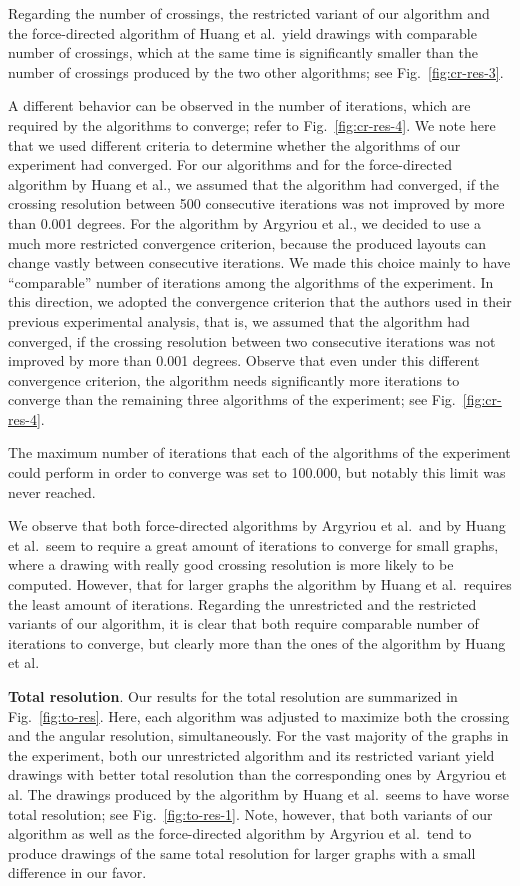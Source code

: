 \documentclass{comjnl}
\newcommand{\myparagraph}[1]{\medskip\noindent\textbf{#1}.}
\begin{document}
Regarding the number of crossings, the restricted variant of our algorithm and the force-directed algorithm of Huang et al.\ yield drawings with comparable number of crossings, which at the same time is significantly smaller than the  number of crossings produced by the two other algorithms; see Fig.~\ref{fig:cr-res-3}.

A different behavior can be observed in the number of iterations, which are required by the algorithms to converge; refer to Fig.~\ref{fig:cr-res-4}. We note here that we used different criteria to determine whether the algorithms of our experiment had converged. For our algorithms and for the force-directed algorithm by Huang et al., we assumed that the algorithm had converged, if the crossing resolution between 500 consecutive iterations was not improved by more than 0.001 degrees. For the algorithm by Argyriou et al., we decided to use a much more restricted convergence criterion, because the produced layouts can change vastly between  consecutive iterations. We made this choice mainly to have ``comparable'' number of iterations among the algorithms of the experiment. In this direction, we adopted the convergence criterion that the authors used in their previous experimental analysis, that is, we assumed that the algorithm had converged, if the crossing resolution between two consecutive iterations was not improved by more than 0.001 degrees. Observe that even under this different convergence criterion, the algorithm needs significantly more iterations to converge than the remaining three algorithms of the experiment; see Fig.~\ref{fig:cr-res-4}. 

The maximum number of iterations that each of the algorithms of the experiment could perform in order to converge was set to 100.000, but notably this limit was never reached. 

We observe that both force-directed algorithms by Argyriou et al.\ and by Huang et al.\ seem to require a great amount of iterations to converge for small graphs, where a drawing with really good crossing resolution is more likely to be computed. However, that for larger graphs the algorithm by Huang et al.\ requires the least amount of iterations. Regarding the unrestricted and the restricted variants of our algorithm, it is clear that both require comparable number of iterations to converge, but clearly more than the ones of the algorithm by Huang et al.

\myparagraph{Total resolution} Our results for the total resolution are summarized in Fig.~\ref{fig:to-res}. Here, each algorithm was adjusted to maximize both the crossing and the angular resolution, simultaneously. For the vast majority of the graphs in the experiment, both our unrestricted algorithm and its restricted variant yield drawings with better total resolution than the corresponding ones by Argyriou et al. The drawings produced by the algorithm by Huang et al.\ seems to have worse total resolution; see Fig.~\ref{fig:to-res-1}. Note, however, that both variants of our algorithm as well as the force-directed algorithm by Argyriou et al.\ tend to produce drawings of the same total resolution for larger graphs with a small difference in our favor.
\end{document}
